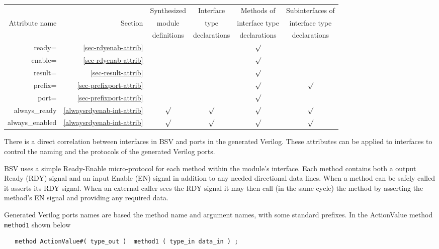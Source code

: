 \documentclass[twoside,letterpaper]{article}
\newcommand{\BSV}{BSV}
\newcommand{\te}[1]{\texttt{#1}}
\begin{document}
\begin{center}
\begin{tabular}{|r|r|c|c|c|c|}
\hline
&&Synthesized&Interface&Methods of&Subinterfaces of\\
Attribute name    &Section   & module  &type &interface type&interface type \\
&&definitions&declarations&declarations&declarations\\
\hline 
\hline
ready=  &\ref{sec-rdyenab-attrib} &     &      &  $\surd$         &  \\
\hline
enable= &\ref{sec-rdyenab-attrib}  &     &   &$\surd$            &  \\
\hline
result= &\ref{sec-result-attrib}   &   &   &$\surd$   & \\
\hline
prefix=  &\ref{sec-prefixport-attrib}&    &  &$\surd$   &$\surd$ \\
\hline
port= &\ref{sec-prefixport-attrib} &  &  & $\surd$   & \\
\hline
always\_ready& \ref{alwaysrdyenab-int-attrib} & $\surd$  & $\surd$  & $\surd$ &    $\surd$ \\
\hline
always\_enabled& \ref{alwaysrdyenab-int-attrib}	& $\surd$   & $\surd$    &$\surd$   &    $\surd$    \\
\hline
\end{tabular}
\end{center}



There is a direct correlation between interfaces in {\BSV} and ports
in the generated Verilog.  These attributes can be applied to
interfaces to control the naming and the protocols of the generated
Verilog ports.

{\BSV} uses a simple Ready-Enable micro-protocol for each method
within the module's interface.  Each method contains both a output
Ready (RDY) signal and an input Enable (EN) signal in addition to any
needed directional data lines.  When a method can be safely called it
asserts its RDY signal.  When an external caller sees the RDY signal
it may then call (in the same cycle) the method by asserting the
method's EN signal and providing any required data.

Generated Verilog ports names are based the method name and argument
names, with some standard prefixes.  In the 
ActionValue method \te{method1} shown below
\begin{verbatim}
   method ActionValue#( type_out )  method1 ( type_in data_in ) ;
\end{verbatim}
\end{document}
